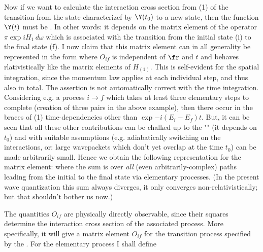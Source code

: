 Now if we want to calculate the interaction cross section from (1) of the transition from the state characterizef by $\Y(t_0)$ to a new state, then the function $\Y(t)$ must be . In other words: it depends on the matrix element of the operator $\pi\exp{iH_1\,{d\omega}}$ which is associated with the transition from the initial state (i) to the final state (f). I now claim that this matrix element can in all generality be represented in the form
where $O_{if}$ is independent of $\fr$ and $t$ and behaves rlativistically like the matrix elements of $H_{(1)}$. This is self-evident for the spatial integration, since the momentum law applies at each individual step, and thus also in total. The assertion is not automatically correct with the time integration. Considering e.g. a process $i \to f$ which takes at least three elementary steps to complete (creation of three pairs in the above example), then there occur in the braces of (1) time-dependencies other than $\exp{-i(E_i-E_f)t}$. But, it can be seen that all these other contributions can be chalked up to the "" (it depends on $t_0$) and with suitable assumptions (e.g. adiabatically switching on the interactions, or: large wavepackets which don't yet overlap at the time $t_0$) can be made arbitrarily small. Hence we obtain the following representation for the matrix element:
where the sum is over \textit{all} (even arbitrarily-complex) paths leading from the initial to the final state via elementary processes. (In the present wave quantization this sum always diverges, it only converges non-relativistically; but that shouldn't bother us now.)

The quantities $O_{if}$ are physically directly observable, since their squares determine the interaction cross section of the associated process. More specifically, it will give a matrix element $O_{if}$ for the transition process specified by the . For the elementary process I shall define

